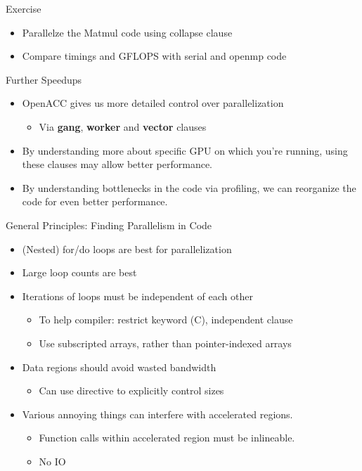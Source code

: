 \documentclass[10pt,t]{beamer}
\begin{document}
\begin{frame}{Exercise}
  \begin{itemize}
    \item Parallelze the Matmul code using collapse clause
    \item Compare timings and GFLOPS with serial and openmp code
  \end{itemize}
\end{frame}

\begin{frame}{ Further Speedups}
  \begin{block}{}
    \begin{itemize}
      \item OpenACC gives us more detailed control over parallelization
      \begin{itemize}
        \item Via \textbf{gang}, \textbf{worker} and \textbf{vector} clauses
      \end{itemize}
      \item By understanding more about specific GPU on which you're running, using these clauses may allow better performance.
      \item By understanding bottlenecks in the code via profiling, we can reorganize the code for even better performance.
    \end{itemize}
  \end{block}
\end{frame}

\begin{frame}{ General Principles: Finding Parallelism in Code}
  \begin{itemize}
    \item (Nested) for/do loops are best for parallelization
    \item Large loop counts are best
    \item Iterations of loops must be independent of each other
    \begin{itemize}
      \item To help compiler: restrict keyword (C), independent clause
      \item Use subscripted arrays, rather than pointer-indexed arrays
    \end{itemize}
    \item Data regions should avoid wasted bandwidth
    \begin{itemize}
      \item Can use directive to explicitly control sizes
    \end{itemize}
    \item Various annoying things can interfere with accelerated regions.
    \begin{itemize}
      \item Function calls within accelerated region must be inlineable.
      \item No IO
    \end{itemize}
  \end{itemize}
\end{frame}
\end{document}
